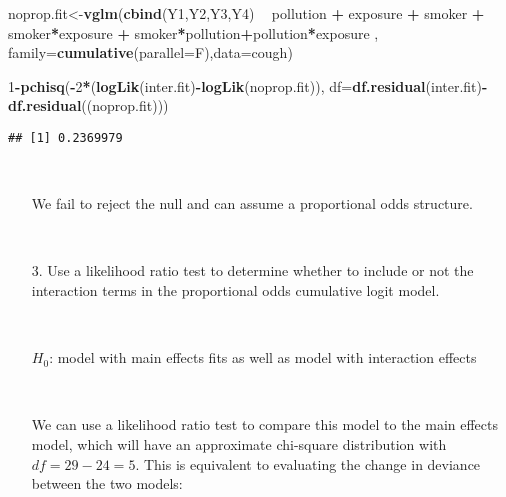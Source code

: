 \documentclass[]{article}
\newenvironment{Shaded}{\begin{snugshade}}{\end{snugshade}}
\newcommand{\KeywordTok}[1]{\textcolor[rgb]{0.13,0.29,0.53}{\textbf{#1}}}
\newcommand{\DataTypeTok}[1]{\textcolor[rgb]{0.13,0.29,0.53}{#1}}
\newcommand{\DecValTok}[1]{\textcolor[rgb]{0.00,0.00,0.81}{#1}}
\newcommand{\StringTok}[1]{\textcolor[rgb]{0.31,0.60,0.02}{#1}}
\newcommand{\OperatorTok}[1]{\textcolor[rgb]{0.81,0.36,0.00}{\textbf{#1}}}
\newcommand{\NormalTok}[1]{#1}
\begin{document}
\begin{Shaded}
\begin{Highlighting}[]
\NormalTok{noprop.fit<-}\KeywordTok{vglm}\NormalTok{(}\KeywordTok{cbind}\NormalTok{(Y1,Y2,Y3,Y4) }\OperatorTok{~}\StringTok{ }\NormalTok{pollution }\OperatorTok{+}\StringTok{ }\NormalTok{exposure }\OperatorTok{+}\StringTok{ }\NormalTok{smoker }\OperatorTok{+}\StringTok{   }\NormalTok{smoker}\OperatorTok{*}\NormalTok{exposure }\OperatorTok{+}\StringTok{ }
\StringTok{  }\NormalTok{smoker}\OperatorTok{*}\NormalTok{pollution}\OperatorTok{+}\NormalTok{pollution}\OperatorTok{*}\NormalTok{exposure , }\DataTypeTok{family=}\KeywordTok{cumulative}\NormalTok{(}\DataTypeTok{parallel=}\NormalTok{F),}\DataTypeTok{data=}\NormalTok{cough)}

\DecValTok{1}\OperatorTok{-}\KeywordTok{pchisq}\NormalTok{(}\OperatorTok{-}\DecValTok{2}\OperatorTok{*}\NormalTok{(}\KeywordTok{logLik}\NormalTok{(inter.fit)}\OperatorTok{-}\KeywordTok{logLik}\NormalTok{(noprop.fit)), }\DataTypeTok{df=}\KeywordTok{df.residual}\NormalTok{(inter.fit)}\OperatorTok{-}\KeywordTok{df.residual}\NormalTok{((noprop.fit)))}
\end{Highlighting}
\end{Shaded}

\begin{verbatim}
## [1] 0.2369979
\end{verbatim}

~

\begin{itemize}
\item[] We fail to reject the null and can assume a proportional odds structure.

\ 

\end{itemize}

\begin{itemize}
\item[3.] Use a likelihood ratio test to determine whether to include or not the interaction terms in the proportional odds cumulative logit model.
\end{itemize}

~

\begin{itemize} \item[] 

\hfil $H_0$: model with main effects fits as well as model with interaction effects

\ 

We can use a likelihood ratio test to compare this model to the main effects model, which will have an approximate chi-square distribution with $df = 29-24 = 5$. This is equivalent to evaluating the change in deviance between the two models:
\end{itemize}
\end{document}
